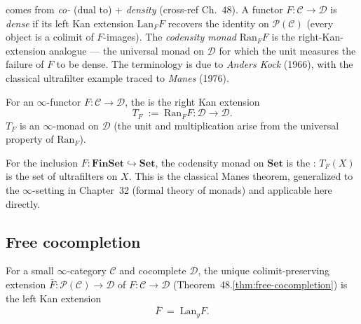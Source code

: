 \begin{nameorigin}
 comes from \emph{co-} (dual to) + \emph{density}
(cross-ref Ch.~48). A functor $F : \mathcal{C} \to \mathcal{D}$ is
\emph{dense} if its left Kan extension $\mathrm{Lan}_F F$ recovers the
identity on $\mathcal{P}(\mathcal{C})$ (every object is a colimit of
$F$-images). The \emph{codensity monad} $\mathrm{Ran}_F F$ is the
right-Kan-extension analogue — the universal monad on $\mathcal{D}$ for
which the unit measures the failure of $F$ to be dense. The terminology
is due to \emph{Anders Kock} (1966), with the classical ultrafilter
example traced to \emph{Manes} (1976).
\end{nameorigin}

\begin{definition}
\label{def:codensity}
For an $\infty$-functor $F : \mathcal{C} \to \mathcal{D}$, the
 is the right Kan extension
\begin{equation*}
  T_F \;:=\; \mathrm{Ran}_F F : \mathcal{D} \to \mathcal{D}.
\end{equation*}
$T_F$ is an $\infty$-monad on $\mathcal{D}$ (the unit and multiplication
arise from the universal property of $\mathrm{Ran}_F$).
\end{definition}

\begin{example_thm}
\label{ex:ultrafilters}
For the inclusion $F : \mathbf{FinSet} \hookrightarrow \mathbf{Set}$,
the codensity monad on $\mathbf{Set}$ is the :
$T_F(X)$ is the set of ultrafilters on $X$. This is the classical Manes
theorem, generalized to the $\infty$-setting in Chapter~32 (formal theory
of monads) and applicable here directly.
\end{example_thm}

\subsection{Free cocompletion}

\begin{theorem}
\label{thm:free-cocomp-kan}
For a small $\infty$-category $\mathcal{C}$ and cocomplete $\mathcal{D}$,
the unique colimit-preserving extension $\bar F : \mathcal{P}(\mathcal{C})
\to \mathcal{D}$ of $F : \mathcal{C} \to \mathcal{D}$
(Theorem~48.\ref{thm:free-cocompletion}) is the left Kan extension
\begin{equation*}
  \bar F \;=\; \mathrm{Lan}_y F.
\end{equation*}
\end{theorem}

